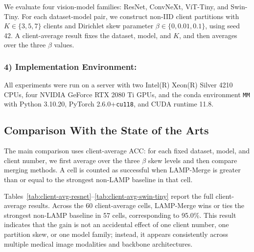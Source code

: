 \documentclass[letterpaper]{article} %
\begin{document}
We evaluate four vision-model families: ResNet, ConvNeXt, ViT-Tiny, and Swin-Tiny. For each dataset-model pair, we construct non-IID client partitions with $K\in\{3,5,7\}$ clients and Dirichlet skew parameter $\beta\in\{0,0.01,0.1\}$, using seed 42\cite{hsu2019measuringeffectsnonidenticaldata}. A client-average result fixes the dataset, model, and $K$, and then averages over the three $\beta$ values.

\subsubsection{4) Implementation Environment:}

All experiments were run on a server with two Intel(R) Xeon(R) Silver 4210 CPUs, four NVIDIA GeForce RTX 2080 Ti GPUs, and the conda environment \texttt{MM} with Python 3.10.20, PyTorch 2.6.0+\texttt{cu118}, and CUDA runtime 11.8.


\subsection{Comparison With the State of the Arts}
The main comparison uses client-average ACC: for each fixed dataset, model, and client number, we first average over the three $\beta$ skew levels and then compare merging methods. A cell is counted as successful when LAMP-Merge is greater than or equal to the strongest non-LAMP baseline in that cell.

Tables~\ref{tab:client-avg-resnet}--\ref{tab:client-avg-swin-tiny} report the full client-average results. Across the 60 client-average cells, LAMP-Merge wins or ties the strongest non-LAMP baseline in 57 cells, corresponding to 95.0\%. This result indicates that the gain is not an accidental effect of one client number, one partition skew, or one model family; instead, it appears consistently across multiple medical image modalities and backbone architectures.
\end{document}
